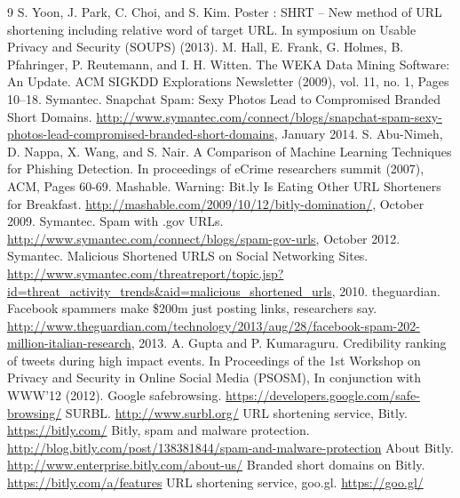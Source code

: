 \documentclass[conference]{IEEEtran}
\begin{document}
\begin{thebibliography} {9}
 S. Yoon, J. Park, C. Choi, and S. Kim. Poster : SHRT – New method of URL shortening including relative word of target URL. In symposium on Usable Privacy and Security (SOUPS) (2013).
 M. Hall, E. Frank, G. Holmes, B. Pfahringer, P. Reutemann, and I. H. Witten. The WEKA Data Mining Software: An Update. ACM SIGKDD Explorations Newsletter (2009), vol. 11, no. 1, Pages 10–18.
 Symantec. Snapchat Spam: Sexy Photos Lead to Compromised Branded Short Domains. \url{http://www.symantec.com/connect/blogs/snapchat-spam-sexy-photos-lead-compromised-branded-short-domains}, January 2014.
 S. Abu-Nimeh, D. Nappa, X. Wang, and S. Nair. A Comparison of Machine Learning Techniques for Phishing Detection. In proceedings of eCrime researchers summit (2007), ACM, Pages 60-69.
 Mashable. Warning: Bit.ly Is Eating Other URL Shorteners for Breakfast. \url{http://mashable.com/2009/10/12/bitly-domination/}, October 2009.
 Symantec. Spam with .gov URLs. \url{http://www.symantec.com/connect/blogs/spam-gov-urls}, October 2012.
 Symantec. Malicious Shortened URLS on Social Networking Sites. \url{http://www.symantec.com/threatreport/topic.jsp?id=threat\_activity\_trends\&aid=malicious\_shortened\_urls}, 2010.
 theguardian. Facebook spammers make \$200m just posting links, researchers say. \url{http://www.theguardian.com/technology/2013/aug/28/facebook-spam-202-million-italian-research}, 2013.
 A. Gupta and P. Kumaraguru. Credibility ranking of tweets during high impact events. In Proceedings of the 1st Workshop on Privacy and Security in Online Social Media (PSOSM), In conjunction with WWW'12 (2012). 
 Google safebrowsing. \url{https://developers.google.com/safe-browsing/}
 SURBL. \url{http://www.surbl.org/}
 URL shortening service, Bitly. \url{https://bitly.com/}
 Bitly, spam and malware protection. \url{http://blog.bitly.com/post/138381844/spam-and-malware-protection}
 About Bitly. \url{http://www.enterprise.bitly.com/about-us/}
 Branded short domains on Bitly. \url{https://bitly.com/a/features}
 URL shortening service, goo.gl. \url{https://goo.gl/}
\end{thebibliography}
\end{document}
